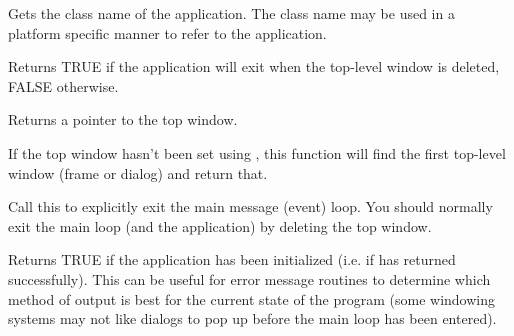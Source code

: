 \label{wxappgetclassname}


Gets the class name of the application. The class name may be used in a platform specific
manner to refer to the application.



\label{wxappgetexitondelete}


Returns TRUE if the application will exit when the top-level window is deleted, FALSE
otherwise.



\label{wxappgettopwindow}


Returns a pointer to the top window.


If the top window hasn't been set using , this
function will find the first top-level window (frame or dialog) and return that.



\label{wxappexitmainloop}


Call this to explicitly exit the main message (event) loop.
You should normally exit the main loop (and the application) by deleting
the top window.

\label{wxappinitialized}


Returns TRUE if the application has been initialized (i.e. if\rtfsp
{} has returned successfully).  This can be useful for error
message routines to determine which method of output is best for the
current state of the program (some windowing systems may not like
dialogs to pop up before the main loop has been entered).

